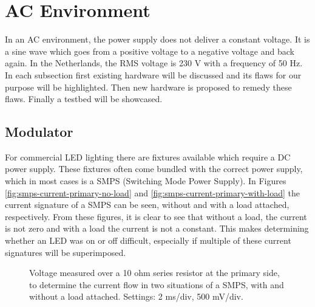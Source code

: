 
\section{AC Environment}
\label{sec:ac-environment}

In an AC environment, the power supply does not deliver a constant voltage.
It is a sine wave which goes from a positive voltage to a negative voltage and back again.
In the Netherlands, the RMS voltage is 230 V with a frequency of 50 Hz.
In each subsection first existing hardware will be discussed and its flaws for our purpose will be highlighted.
Then new hardware is proposed to remedy these flaws.
Finally a testbed will be showcased.





\subsection{Modulator}	

For commercial LED lighting there are fixtures available which require a DC power supply.
These fixtures often come bundled with the correct power supply, which in most cases is a SMPS (Switching Mode Power Supply).
In Figures \ref{fig:smps-current-primary-no-load} and \ref{fig:smps-current-primary-with-load} the current signature of a SMPS can be seen, without and with a load attached, respectively.
From these figures, it is clear to see that without a load, the current is not zero and with a load the current is not a constant.
This makes determining whether an LED was on or off difficult, especially if multiple of these current signatures will be superimposed.


\begin{figure}
	\centering     %

	\caption{Voltage measured over a 10 ohm series resistor at the primary side, to determine the current flow in two situations of a SMPS, with and without a load attached. Settings: 2 ms/div, 500 mV/div.}
\end{figure}



